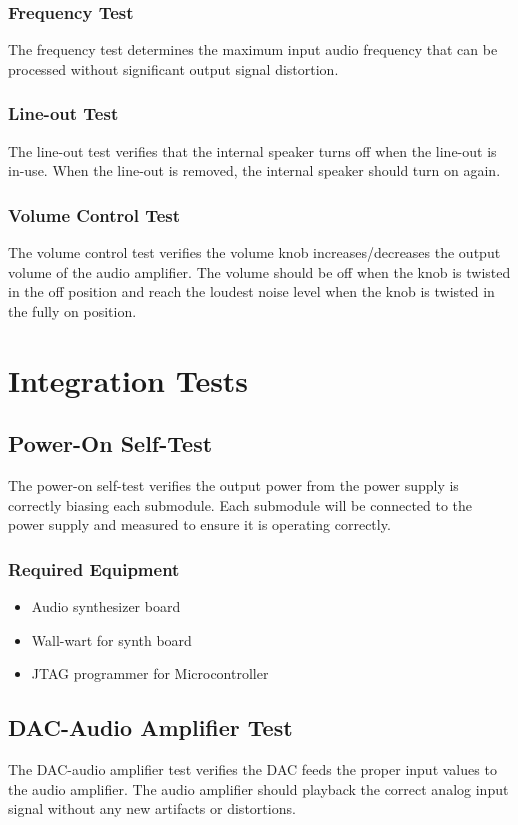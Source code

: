 \documentclass{article}
\begin{document}
\subsubsection{Frequency Test}
The frequency test determines the maximum input audio frequency that can be processed without significant output signal distortion.
\subsubsection{Line-out Test}
The line-out test verifies that the internal speaker turns off when the line-out is in-use.  When the line-out is removed, the internal speaker should turn on again.
\subsubsection{Volume Control Test}
The volume control test verifies the volume knob increases/decreases the output volume of the audio amplifier.  The volume should be off when the knob is twisted in the off position and reach the loudest noise level when the knob is twisted in the fully on position.

\section{Integration Tests}

\subsection{Power-On Self-Test}
The power-on self-test verifies the output power from the power supply is correctly biasing each submodule.  Each submodule will be connected to the power supply and measured to ensure it is operating correctly.

\subsubsection{Required Equipment}
\begin{itemize}
\item Audio synthesizer board
\item Wall-wart for synth board
\item JTAG programmer for Microcontroller
\end{itemize}

\subsection{DAC-Audio Amplifier Test}
The DAC-audio amplifier test verifies the DAC feeds the proper input values to the audio amplifier.  The audio amplifier should playback the correct analog input signal without any new artifacts or distortions.
\end{document}
